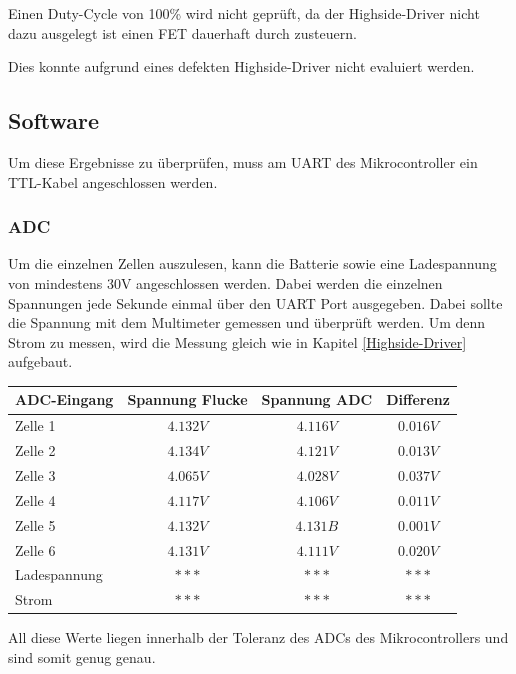 Einen Duty-Cycle von 100\% wird nicht geprüft, da der Highside-Driver nicht dazu ausgelegt ist einen FET dauerhaft durch zusteuern.

Dies konnte aufgrund eines defekten Highside-Driver nicht evaluiert werden. 

\subsection*{Software}
Um diese Ergebnisse zu überprüfen, muss am UART des Mikrocontroller ein TTL-Kabel angeschlossen werden.

\subsubsection*{ADC}
Um die einzelnen Zellen auszulesen, kann die Batterie sowie eine Ladespannung von mindestens 30V angeschlossen werden. Dabei werden die einzelnen Spannungen jede Sekunde einmal über den UART Port ausgegeben. Dabei sollte die Spannung mit dem Multimeter gemessen und überprüft werden. Um denn Strom zu messen, wird die Messung gleich wie in Kapitel \ref{Highside-Driver} aufgebaut. 

\begin{center}
	\begin{tabular}{|l|c|c|c|}
		\hline 
		ADC-Eingang & Spannung Flucke & Spannung ADC & Differenz \\ \hline
		Zelle 1 & $4.132V$ & $4.116V$ & $0.016V$ \\ \hline
		Zelle 2 & $4.134V$ & $4.121V$ & $0.013V$ \\ \hline
		Zelle 3 & $4.065V$ & $4.028V$ & $0.037V$ \\ \hline
		Zelle 4 & $4.117V$ & $4.106V$ & $0.011V$ \\ \hline
		Zelle 5 & $4.132V$ & $4.131B$ & $0.001V$ \\ \hline
		Zelle 6 & $4.131V$ & $4.111V$ & $0.020V$ \\ \hline
		Ladespannung & $***$ & $***$ & $***$ \\ \hline
		Strom & $***$ & $***$ & $***$ \\ \hline
	\end{tabular} 
	\label{tab:LadestromHighsideDriver}
\end{center}

All diese Werte liegen innerhalb der Toleranz des ADCs des Mikrocontrollers und sind somit genug genau.

